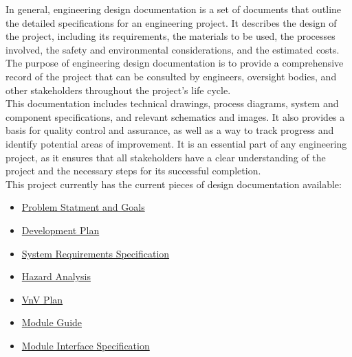 \documentclass[12pt, titlepage]{article}
\begin{document}
In general, engineering design documentation is a set of documents that outline the detailed specifications for an engineering project. It describes the design of the project, including its requirements, the materials to be used, the processes involved, the safety and environmental considerations, and the estimated costs. The purpose of engineering design documentation is to provide a comprehensive record of the project that can be consulted by engineers, oversight bodies, and other stakeholders throughout the project’s life cycle.\\

This documentation includes technical drawings, process diagrams, system and component specifications, and relevant schematics and images. It also provides a basis for quality control and assurance, as well as a way to track progress and identify potential areas of improvement. It is an essential part of any engineering project, as it ensures that all stakeholders have a clear understanding of the project and the necessary steps for its successful completion.\\

This project currently has the current pieces of design documentation available:

\begin{itemize}
	\item \href{https://github.com/zakerl/Capstone_Project/blob/main/docs/ProblemStatementAndGoals/Team1_ProblemStatement\%20\%26\%20Goals.pdf}{Problem Statment and Goals}\\
	\item \href{https://github.com/zakerl/Capstone_Project/blob/main/docs/DevelopmentPlan/DevelopmentPlan.pdf}{Development Plan}\\
	\item \href{https://github.com/zakerl/Capstone_Project/blob/main/docs/SRS/SRS.pdf}{System Requirements Specification}\\
	\item \href{https://github.com/zakerl/Capstone_Project/blob/main/docs/HazardAnalysis/HazardAnalysis.pdf}{Hazard Analysis}\\
	\item \href{https://github.com/zakerl/Capstone_Project/blob/main/docs/VnVPlan/VnVPlan.pdf}{VnV Plan}\\
	\item \href{https://github.com/zakerl/Capstone_Project/blob/main/docs/Design/SoftArchitecture/MG.pdf}{Module Guide}\\
	\item \href{https://github.com/zakerl/Capstone_Project/blob/main/docs/Design/SoftDetailedDes/MIS.pdf}{Module Interface Specification}\\
\end{itemize}
\end{document}
